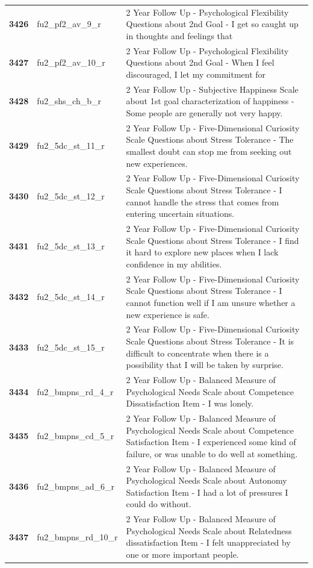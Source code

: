 \documentclass[
  letterpaper,
  DIV=11,
  numbers=noendperiod]{scrartcl}
\begin{document}
\begin{longtable}[t]{>{}cll}
\addlinespace
\textbf{3426} & fu2\_pf2\_av\_9\_r & 2 Year Follow Up - Psychological Flexibility Questions about 2nd Goal - I get so caught up in thoughts and feelings that\\
\textbf{3427} & fu2\_pf2\_av\_10\_r & 2 Year Follow Up - Psychological Flexibility Questions about 2nd Goal - When I feel discouraged, I let my commitment for\\
\textbf{3428} & fu2\_shs\_ch\_b\_r & 2 Year Follow Up - Subjective Happiness Scale about 1st goal characterization of happiness - Some people are generally not very happy.\\
\textbf{3429} & fu2\_5dc\_st\_11\_r & 2 Year Follow Up - Five-Dimensional Curiosity Scale Questions about Stress Tolerance - The smallest doubt can stop me from seeking out new experiences.\\
\textbf{3430} & fu2\_5dc\_st\_12\_r & 2 Year Follow Up - Five-Dimensional Curiosity Scale Questions about Stress Tolerance - I cannot handle the stress that comes from entering uncertain situations.\\
\addlinespace
\textbf{3431} & fu2\_5dc\_st\_13\_r & 2 Year Follow Up - Five-Dimensional Curiosity Scale Questions about Stress Tolerance - I find it hard to explore new places when I lack confidence in my abilities.\\
\textbf{3432} & fu2\_5dc\_st\_14\_r & 2 Year Follow Up - Five-Dimensional Curiosity Scale Questions about Stress Tolerance - I cannot function well if I am unsure whether a new experience is safe.\\
\textbf{3433} & fu2\_5dc\_st\_15\_r & 2 Year Follow Up - Five-Dimensional Curiosity Scale Questions about Stress Tolerance - It is difficult to concentrate when there is a possibility that I will be taken by surprise.\\
\textbf{3434} & fu2\_bmpns\_rd\_4\_r & 2 Year Follow Up - Balanced Measure of Psychological Needs Scale about Competence Dissatisfaction Item - I was lonely.\\
\textbf{3435} & fu2\_bmpns\_cd\_5\_r & 2 Year Follow Up - Balanced Measure of Psychological Needs Scale about Competence Satisfaction Item - I experienced some kind of failure, or was unable to do well at something.\\
\addlinespace
\textbf{3436} & fu2\_bmpns\_ad\_6\_r & 2 Year Follow Up - Balanced Measure of Psychological Needs Scale about Autonomy Satisfaction Item - I had a lot of pressures I could do without.\\
\textbf{3437} & fu2\_bmpns\_rd\_10\_r & 2 Year Follow Up - Balanced Measure of Psychological Needs Scale about Relatedness dissatisfaction Item - I felt unappreciated by one or more important people.\\

\end{longtable}
\end{document}
